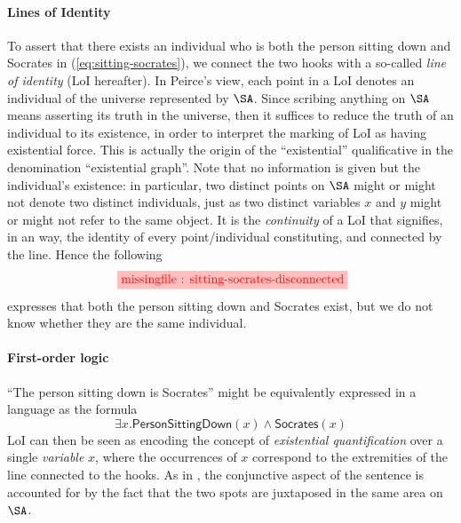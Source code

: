 \begin{scope}
\begin{scope}
\paragraph{Lines of Identity} To assert that there exists an individual who is
both the person sitting down and Socrates in  (\ref{eq:sitting-socrates}),
we connect the two hooks with a so-called \emph{line of identity} (LoI
hereafter). In Peirce's view, each point in a LoI denotes an individual of the
universe represented by $\SA$. Since scribing anything on $\SA$ means asserting
its truth in the universe, then it suffices to reduce the truth of an individual
to its existence, in order to interpret the marking of LoI as having existential
force. This is actually the origin of the ``existential'' qualificative in the
denomination ``existential graph''. Note that no information is given but the
individual's existence: in particular, two distinct points on $\SA$ might or
might not denote two distinct individuals, just as two distinct variables $x$
and $y$ might or might not refer to the same object. It is the \emph{continuity}
of a LoI that signifies, in an  way, the identity of every
point/individual constituting, and connected by the line. Hence the following
$$\tikzfig{1}{0.5}{sitting-socrates-disconnected}$$ expresses that both the
person sitting down and Socrates exist, but we do not know whether they are the
same individual.

\paragraph{First-order logic} ``The person sitting down is Socrates'' might be
equivalently expressed in a  language as the formula
\begin{equation}
  \exists x. \mathsf{PersonSittingDown}(x) \wedge \mathsf{Socrates}(x) \label{eq:sitting-socrates-fo}
\end{equation}
LoI can then be seen as encoding the concept of \emph{existential
quantification} over a single \emph{variable} $x$, where the occurrences of $x$
correspond to the extremities of the line connected to the hooks. As in
, the conjunctive aspect of the sentence is accounted for by the fact
that the two spots are juxtaposed in the same area on $\SA$.


\end{scope}
\end{scope}
